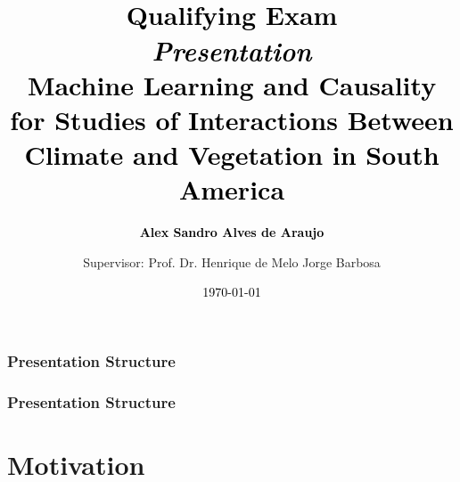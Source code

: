 \documentclass[11pt]{beamer}
\begin{document}
\title[
  \textbf{\textcolor{blue}{
      Presentation
  }} 
]{\\[0.01cm]
  \large{\textbf{\textcolor{black}{
        Qualifying Exam
  }}} \\
  
  \small{\textcolor{black}{
      \emph{Presentation}
  }} \\[0.50cm]

  \large{\textbf{\textcolor{black}{
        Machine Learning and Causality for Studies of Interactions Between
        Climate and Vegetation in South America 
  }}}
} 

\author{
  \textcolor{black}{\textbf{
      Alex Sandro Alves de Araujo 
  }} \\ \and Supervisor: Prof. Dr. Henrique de Melo Jorge Barbosa
} 


\date{
  \textcolor{black}{
    \today
  }
}

{
  \begin{frame}
    \titlepage 
  \end{frame}
}

\begin{frame}
  \frametitle{\normalsize{\textbf{
        Presentation Structure
  }}}
  
  \tableofcontents
  
\end{frame}

\begin{frame}
  \frametitle{\normalsize{\textbf{
        Presentation Structure
  }}}

  \section{Motivation}
  \tableofcontents[currentsection] 

\end{frame}
\end{document}
